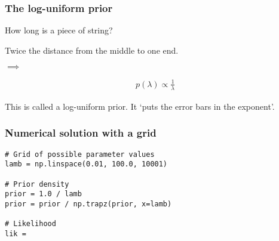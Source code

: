 \documentclass{beamer}
\begin{document}
\begin{frame}
\frametitle{The log-uniform prior}
How long is a piece of string?

\pause
Twice the distance from the middle to one end.

$\implies$

\begin{align}
p(\lambda) \propto \frac{1}{\lambda}
\end{align}

This is called a log-uniform prior. It `puts the error bars in the exponent'.

\end{frame}


\begin{frame}[t, fragile]
\frametitle{Numerical solution with a grid}

\begin{verbatim}
# Grid of possible parameter values
lamb = np.linspace(0.01, 100.0, 10001)

# Prior density
prior = 1.0 / lamb
prior = prior / np.trapz(prior, x=lamb)

# Likelihood
lik = 
\end{verbatim}

\end{frame}
\end{document}
